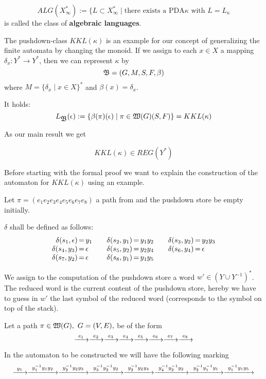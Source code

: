 \begin{definition}
\[ ALG(X_\infty^*) := \{ L \subset X_\infty^* \mid \text{there exists a PDA
$\kappa$ with $L = L_\kappa$} \]
is called the class of {\bf algebraic languages}.
\end{definition}

The pushdown-class $KKL(\kappa)$ is an example for our concept of generalizing
the finite automata by changing the monoid. If we assign to each $x\in X$ a
mapping $\delta_x: Y^* \to Y^*$, then we can represent $\kappa$ by
\[ \mbox{$\mathfrak{B}$} = (G, M, S, F, \beta) \]
where $M = \{ \delta_x \mid x\in X \}^*$ and $\beta(x) = \delta_x$.

It holds:
\[ L_{\mbox{$\mathfrak{B}$}}(\epsilon) := \{ \beta(\pi)(\epsilon) \mid \pi \in
\mbox{$\mathfrak{W}(G)$}(S, F) \} = KKL(\kappa) \]

As our main result we get
\begin{theorem}
\[ KKL(\kappa) \in REG(Y^*) \]
\end{theorem}

Before starting with the formal proof we want to explain the construction of the
automaton for $KKL(\kappa)$ using an example.

Let $\pi = (e_1 e_2 e_3 e_4 e_5 e_6 e_7 e_8)$ a path from  and the
pushdown store be empty initially.

$\delta$ shall be defined as follows:
\[\begin{array}{r@{\,=\,}l@{\qquad}r@{\,=\,}l@{\qquad}r@{\,=\,}l}
\delta(s_1,\epsilon)&y_1 & \delta(s_2,y_1)&y_1y_2 & \delta(s_3,y_2)&y_2y_3 \\
\delta(s_4,y_3)&\epsilon & \delta(s_5,y_2)&y_2y_4 & \delta(s_6,y_4)&\epsilon \\
\delta(s_7,y_2)&\epsilon & \delta(s_8,y_1)&y_1y_5
\end{array}\]

We assign to the computation of the pushdown store a word $w' \in (Y\cup
Y^{-1})^*$. The reduced word is the current content of the pushdown store,
hereby we have to guess in $w'$ the last symbol of the reduced word
(corresponds to the symbol on top of the stack).

Let a path $\pi \in \pathcategory{G},\ G=(V,E),$ be of the form
\[ \xrightarrow{\ {e_1}\ } \xrightarrow{\ {e_2}\ } \xrightarrow{\ {e_3}\ } \xrightarrow{\ {e_4}\ } \xrightarrow{\ {e_5}\ } \xrightarrow{\ {e_6}\ } \xrightarrow{\ {e_7}\ }
\xrightarrow{\ {e_8}\ } \]

In the automaton to be constructed we will have the following marking
\[ \xrightarrow{\ {y_1}\ } \xrightarrow{\ {y_1^{-1} y_1 y_2}\ } \xrightarrow{\ {y_2^{-1} y_2 y_3}\ } \xrightarrow{\ {y_3^{-1}
y_2^{-1} y_2}\ } \xrightarrow{\ {y_2^{-1} y_2 y_4}\ } \xrightarrow{\ {y_4^{-1} y_2^{-1} y_2}\ }
\xrightarrow{\ {y_2^{-1} y_1^{-1} y_1}\ } \xrightarrow{\ {y_1^{-1} y_1 y_5}\ }
\]

